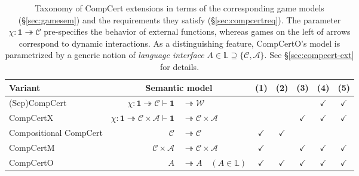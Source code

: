 \documentclass[11pt,oneside,draft]{book}
\theoremstyle{definition}
\begin{document}
\begin{table} %
  \small
  \begin{tabular}{l@{\qquad}r@{}l@{\qquad}c@{\:}c@{\:}c@{\:}c@{\:}c}
    \hline
    Variant & \multicolumn{2}{c}{Semantic model} & (1) & (2) & (3) & (4) & (5) \\
    \hline
    (Sep)CompCert \citep{compcert,sepcompcert} &
      $\chi : \mathbf{1} \twoheadrightarrow \mathcal{C}
      \vdash \mathbf{1} $ & ${} \twoheadrightarrow \mathcal{W}$ &
      & & & $\checkmark$ & $\checkmark$ \\
    CompCertX \citep{popl15} &
      \hspace{-1em}
      $\chi : \mathbf{1} \twoheadrightarrow \mathcal{C} \times \mathcal{A}
       \vdash
       \mathbf{1} $ & ${} \twoheadrightarrow \mathcal{C} \times \mathcal{A}$
      & & & $\checkmark$ & $\checkmark$ & $\checkmark$ \\
    Compositional CompCert \citep{compcompcert} &
      $\mathcal{C}$ & ${} \twoheadrightarrow \mathcal{C}$ &
      $\checkmark$ & $\checkmark$ & & & \\
    CompCertM \citep{compcertm} &
      $\mathcal{C} \times \mathcal{A} $ & ${}\twoheadrightarrow
       \mathcal{C} \times \mathcal{A}$ &
      $\checkmark$ & & $\checkmark$ & $\checkmark$ & $\checkmark$ \\
    CompCertO &
      $A $ & ${}\twoheadrightarrow A \quad
      (A \in \mathbb{L})$ &
      $\checkmark$&$\checkmark$&$\checkmark$&$\checkmark$&$\checkmark$ \\
    \hline
  \end{tabular}
  \caption[Taxonomy of CompCert extensions]%
   {Taxonomy of CompCert extensions
    in terms of the corresponding game models (\S\ref{sec:gamesem})
    and the requirements they satisfy (\S\ref{sec:compcertreq}).
    The parameter $\chi : \mathbf{1} \twoheadrightarrow \mathcal{C}$
    pre-specifies the behavior of external functions,
    whereas games on the left of arrows
    correspond to dynamic interactions.
    As a distinguishing feature,
    CompCertO's model is parametrized by a generic notion of
    \emph{language interface}
    $A \in \mathbb{L} \supseteq \{\mathcal{C}, \mathcal{A}\}$.
    See \S\ref{sec:compcert-ext} for details.
  }
  \label{tbl:compcerts}
\end{table}
\end{document}
